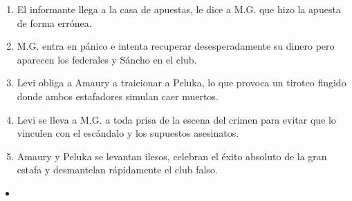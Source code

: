 \documentclass[12pt,letterpaper]{article}
\begin{document}
\begin{enumerate}
    \item El informante llega a la casa de apuestas, le dice a M.G. que hizo la apuesta de forma errónea.
    \item M.G. entra en pánico e intenta recuperar desesperadamente su dinero pero aparecen los federales  y Sáncho en el club.
    \item Levi obliga a Amaury a traicionar a Peluka, lo que provoca un tiroteo fingido donde ambos estafadores simulan caer muertos.
    \item Levi se lleva a M.G. a toda prisa de la escena del crimen para evitar que lo vinculen con el escándalo y los supuestos asesinatos.
    \item Amaury y Peluka se levantan ilesos, celebran el éxito absoluto de la gran estafa y desmantelan rápidamente el club falso.
\end{enumerate}

\begin{itemize}
    \item 
\end{itemize}
\end{document}
